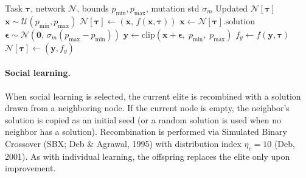 \documentclass[11pt,a4paper]{article}
\begin{document}
\begin{algorithm}[H]
\caption{Individual Learning}\label{alg:individual}
\begin{algorithmic}[1]
\Require Task $\boldsymbol{\tau}$, network $\mathcal{N}$,
         bounds $p_{\min}, p_{\max}$, mutation std $\sigma_m$
\Ensure Updated $\mathcal{N}[\boldsymbol{\tau}]$
    \State $\mathbf{x} \sim \mathcal{U}(p_{\min}, p_{\max})$
    \State $\mathcal{N}[\boldsymbol{\tau}] \gets (\mathbf{x},\,
           f(\mathbf{x}, \boldsymbol{\tau}))$
    \State \Return
\EndIf
\State $\mathbf{x} \gets \mathcal{N}[\boldsymbol{\tau}].\text{solution}$
\State $\boldsymbol{\epsilon} \sim \mathcal{N}(\mathbf{0},\,
       \sigma_m (p_{\max} - p_{\min}))$
\State $\mathbf{y} \gets \text{clip}(\mathbf{x} +
       \boldsymbol{\epsilon},\; p_{\min},\; p_{\max})$
\State $f_y \gets f(\mathbf{y}, \boldsymbol{\tau})$
    \State $\mathcal{N}[\boldsymbol{\tau}] \gets (\mathbf{y}, f_y)$
\EndIf
\end{algorithmic}
\end{algorithm}

\paragraph{Social learning.}
When social learning is selected, the current elite is recombined with
a solution drawn from a neighboring node. If the current node is empty,
the neighbor's solution is copied as an initial seed (or a random
solution is used when no neighbor has a solution). Recombination is
performed via Simulated Binary Crossover (SBX; Deb \& Agrawal, 1995)
with distribution index $\eta_c=10$ (Deb, 2001). As with individual
learning, the offspring replaces the elite only upon improvement.
\end{document}
